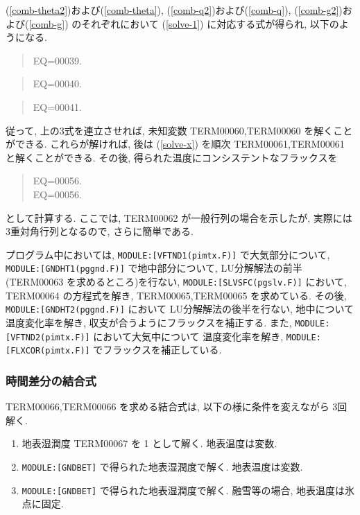 (\ref{comb-theta2})および(\ref{comb-theta}), 
(\ref{comb-q2})および(\ref{comb-q}), 
(\ref{comb-g2})および(\ref{comb-g})  のそれぞれにおいて
(\ref{solve-1}) に対応する式が得られ, 以下のようになる.

\begin{quote}
EQ=00039.
\end{quote}
\begin{quote}
EQ=00040.
\end{quote}
\begin{quote}
EQ=00041.
\end{quote}

従って, 上の3式を連立させれば,
未知変数 TERM00060,TERM00060 を解くことができる.
これらが解ければ, 後は
(\ref{solve-x}) を順次 TERM00061,TERM00061 と解くことができる.
%
その後, 得られた温度にコンシステントなフラックスを
\begin{quote}
EQ=00056.\\
EQ=00056.
\end{quote}
として計算する.
%
ここでは, TERM00062 が一般行列の場合を示したが,
実際には3重対角行列となるので, さらに簡単である.

プログラム中においては,
\texttt{MODULE:[VFTND1(pimtx.F)]} で大気部分について,
\texttt{MODULE:[GNDHT1(pggnd.F)]} で地中部分について, LU分解解法の前半
(TERM00063 を求めるところ)を行ない, 
\texttt{MODULE:[SLVSFC(pgslv.F)]} において, TERM00064 の方程式を解き,
TERM00065,TERM00065 を求めている.
その後, \texttt{MODULE:[GNDHT2(pggnd.F)]} において
LU分解解法の後半を行ない, 地中について温度変化率を解き, 
収支が合うようにフラックスを補正する.
また, \texttt{MODULE:[VFTND2(pimtx.F)]} において大気中について
温度変化率を解き, 
\texttt{MODULE:[FLXCOR(pimtx.F)]} でフラックスを補正している.

\subsubsection{時間差分の結合式}

TERM00066,TERM00066 を求める結合式は, 
以下の様に条件を変えながら 3回解く. 
\begin{enumerate}
\item 地表湿潤度 TERM00067 を 1 として解く. 地表温度は変数. 
\item \texttt{MODULE:[GNDBET]} で得られた地表湿潤度で解く. 
      地表温度は変数.
\item \texttt{MODULE:[GNDBET]} で得られた地表湿潤度で解く. 
      融雪等の場合, 地表温度は氷点に固定. 
\end{enumerate}

